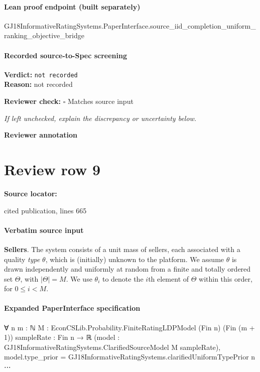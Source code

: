 \documentclass[10pt]{article}
\newcommand{\reviewerbox}{%
  \par\noindent\fbox{\parbox{0.96\linewidth}{\rule{0pt}{0.38in}}}\par
}
\newcommand{\reviewmatch}[1]{%
  \par\noindent\textbf{Reviewer check:} $\square$\; #1\par
  \noindent\emph{If left unchecked, explain the discrepancy or uncertainty below.}\par
}
\begin{document}
\paragraph{Lean proof endpoint (built separately)}\begin{ReviewVerbatim}
GJ18InformativeRatingSystems.PaperInterface.source_iid_completion_uniform_ranking_objective_bridge
\end{ReviewVerbatim}

\paragraph{Recorded source-to-Spec screening}
\textbf{Verdict:} \texttt{not recorded}
\\
\textbf{Reason:} not recorded
\reviewmatch{Matches source input}
\noindent\textbf{Reviewer annotation}\par
\reviewerbox
\clearpage
\hypertarget{source-claim-1f3b4948b5efbf34}{}
\section*{Review row 9}
\textbf{Source locator:} {\footnotesize\raggedright cited publication, lines 665\par}
\paragraph{Verbatim source input}
\begin{ReviewVerbatim}
{\bf Sellers}.  The system consists of a unit mass of sellers, each associated with a quality \textit{type} $\theta$, which is (initially) unknown to the platform. We assume $\theta$ is drawn independently and uniformly at random from a finite and totally ordered set $\Theta$, with $|\Theta| = M$. We use $\theta_i$ to denote the $i$th element of $\Theta$ within this order, for $0\leq i < M$.
\end{ReviewVerbatim}


\paragraph{Expanded PaperInterface specification}
\begin{ReviewVerbatim}
∀ {n m : ℕ} {M : EconCSLib.Probability.FiniteRatingLDPModel (Fin n) (Fin (m + 1))} {sampleRate : Fin n → ℝ}
  (model : GJ18InformativeRatingSystems.ClarifiedSourceModel M sampleRate),
  model.type_prior = GJ18InformativeRatingSystems.clarifiedUniformTypePrior n ⋯
\end{ReviewVerbatim}
\end{document}

